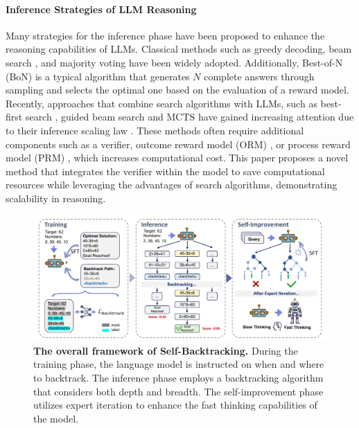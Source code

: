 \documentclass{article}
\theoremstyle{plain}
\theoremstyle{definition}
\theoremstyle{remark}
\begin{document}
\paragraph{Inference Strategies of LLM Reasoning}
Many strategies for the inference phase have been proposed to enhance the reasoning capabilities of LLMs. Classical methods such as greedy decoding, beam search \citep{teller2000speech,graves2012sequence}, and majority voting \cite{wang2022selfconsistency} have been widely adopted. Additionally, Best-of-N (BoN) \cite{bonw} is a typical algorithm that generates $N$ complete answers through sampling and selects the optimal one based on the evaluation of a reward model. Recently, approaches that combine search algorithms with LLMs, such as best-first search \cite{tot}, guided beam search \cite{xie2024self} and MCTS \cite{choi2023kcts,feng2023alphazero,zhang2024rest,xie2024monte} have gained increasing attention due to their inference scaling law \cite{wu2024inference,snell2024scaling}. These methods often require additional components such as a verifier, outcome reward model (ORM) \cite{lightman2023let}, or process reward model (PRM) \cite{lightman2023let,wang2024math}, which increases computational cost. This paper proposes a novel method that integrates the verifier within the model to save computational resources while leveraging the advantages of search algorithms, demonstrating scalability in reasoning.

\begin{figure}[t]
    \centering
    \includegraphics[width=\textwidth]{fig/method.pdf}
    \caption{
        \textbf{The overall framework of Self-Backtracking.} During the training phase, the language model is instructed on when and where to backtrack. The inference phase employs a backtracking algorithm that considers both depth and breadth. The self-improvement phase utilizes expert iteration to enhance the fast thinking capabilities of the model.
        }
    \label{method}
\end{figure}
\end{document}
